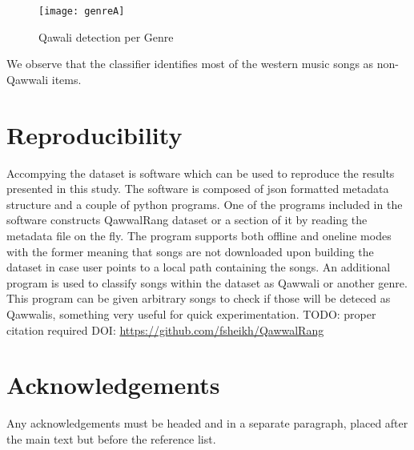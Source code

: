 \documentclass{article}
\begin{document}
\begin{figure}[htbp]
  \centering
  \texttt{[image: genreA]}
  \caption{Qawali detection per Genre}
\label{fig:src_genre}
\end{figure}
We observe that the classifier identifies most of the western music songs as non-Qawwali items. 
\section{Reproducibility}
Accompying the dataset is software which can be used to reproduce the results presented in this study. The software is composed of json formatted metadata structure and a couple of python programs. One of the programs included in the software constructs QawwalRang dataset or a section of it by reading the metadata file on the fly. The program supports both offline and oneline modes with the former meaning that songs are not downloaded upon building the dataset in case user points to a local path containing the songs. An additional program is used to classify songs within the dataset as Qawwali or another genre. This program can be given arbitrary songs to check if those will be deteced as Qawwalis, something very useful for quick experimentation. TODO: proper citation required DOI: \url{https://github.com/fsheikh/QawwalRang} 


\section*{Acknowledgements}

Any acknowledgements must be headed and in a separate paragraph,
placed after the main text but before the reference list.




%
%
%
%
\end{document}
